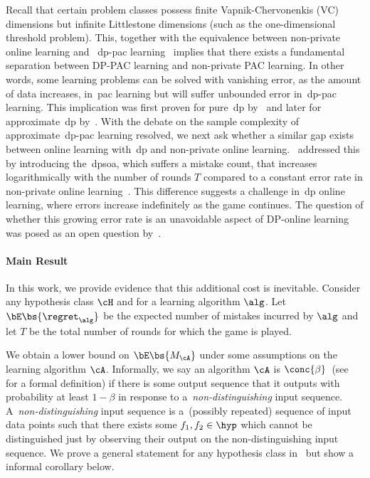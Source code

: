 Recall that certain problem classes possess finite Vapnik-Chervonenkis (VC) dimensions but infinite Littlestone dimensions (such as the one-dimensional threshold problem). This, together with the equivalence between non-private online learning and ~\Gls{dp}-\Gls{pac} learning~\citep{alon2022private} implies that there exists a fundamental separation between DP-PAC learning and non-private PAC learning. In other words, some learning problems can be solved with vanishing error, as the amount of data increases, in~\Gls{pac} learning but will suffer unbounded error in~\Gls{dp}-\Gls{pac} learning. This implication was first proven for pure~\Gls{dp} by~\citet{feldman2014sample} and later for approximate~\Gls{dp} by~\citet{alon2019private}. With the debate on the sample complexity of approximate~\Gls{dp}-\Gls{pac} learning resolved, we next ask whether a similar gap exists between online learning with~\Gls{dp} and non-private online learning.~\citet{golowich2021littlestone} addressed this by introducing the~\Gls{dpsoa}, which suffers a mistake count, that increases logarithmically with the number of rounds \(T\) compared to a constant error rate in non-private online learning~\citep{littlestone1988learning}. This difference suggests a challenge in~\Gls{dp} online learning, where errors increase indefinitely as the game continues. The question of whether this growing error rate is an unavoidable aspect of DP-online learning was posed as an open question by~\citet{dpopsanyal22a}.

\paragraph{Main Result} In this work, we provide evidence that this additional cost is inevitable. Consider any hypothesis class \(\cH\) and for a learning algorithm \(\alg\). Let \(\bE\bs{\regret_{\alg}}\) be the expected number of mistakes incurred by \(\alg\) and let \(T\) be the total number of rounds for which the game is played. 


We obtain a lower bound on \(\bE\bs{M_{\cA}}\) under some assumptions on the learning algorithm \(\cA\). Informally, we say an algorithm \(\cA\) is \(\conc{\beta}\)~(see~ for a formal definition) if there is some output sequence that it outputs with probability at least \(1-\beta\) in response to a~\emph{non-distinguishing} input sequence. A~\emph{non-distinguishing} input sequence is a~(possibly repeated) sequence of input data points such that there exists some \(f_1,f_2\in\hyp\) which cannot be distinguished just by observing their output on the non-distinguishing input sequence. We prove a general statement for any hypothesis class in~ but show a informal corollary below.

